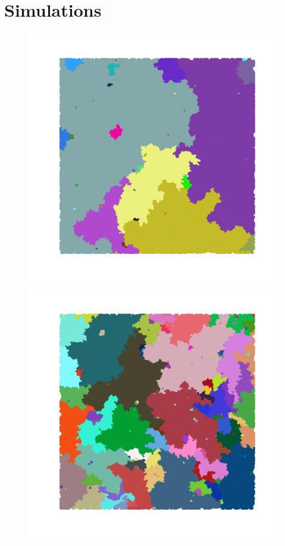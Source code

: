 \documentclass[reprint,amsmath,amssymb,aps,floatfix]{revtex4-1}
\begin{document}
\section{\label{app:sims} Simulations}
%
\begin{figure}[!b]
\centering
  	\includegraphics[scale=0.08]{avalanche_image_size1000000_seed150_r0pt5.png}
  	\includegraphics[scale=0.08]{avalanche_image_size1000000_seed750_r1pt0.png}

\end{figure}
\end{document}
